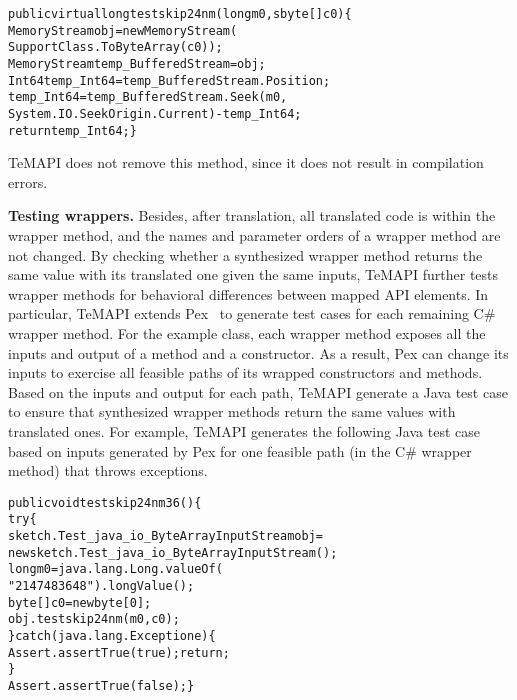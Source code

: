 \begin{CodeOut}
\begin{alltt}
public virtual long testskip24nm(long m0, sbyte[] c0)\{
  MemoryStream obj = new MemoryStream(
                    SupportClass.ToByteArray(c0));
  MemoryStream temp_BufferedStream = obj;
  Int64 temp_Int64 = temp_BufferedStream.Position;
  temp_Int64 = temp_BufferedStream.Seek(m0,
       System.IO.SeekOrigin.Current) - temp_Int64;
  return temp_Int64;\}
\end{alltt}
\end{CodeOut}\vspace*{-2ex}

TeMAPI does not remove this method, since it does not result in compilation errors.


\textbf{Testing wrappers.} Besides, after translation, all translated code is within the wrapper method, and the names and parameter orders of a wrapper method are not changed. By checking whether a synthesized wrapper method returns the same value with its translated one given the same inputs, TeMAPI further tests wrapper methods for behavioral differences between mapped API elements. In particular, TeMAPI extends Pex~\cite{tillmann2008pex} to generate test cases for each remaining C\# wrapper method. For the example class, each wrapper method exposes all the inputs and output of a method and a constructor. As a result, Pex can change its inputs to exercise all feasible paths of its wrapped constructors and methods. Based on the inputs and output for each path, TeMAPI generate a Java test case to ensure that synthesized wrapper methods return the same values with translated ones. For example, TeMAPI generates the following Java test case based on inputs generated by Pex for one feasible path (in the C\# wrapper method) that throws exceptions.

\begin{CodeOut}\vspace*{-1ex}
\begin{alltt}
public void testskip24nm36()\{
  try\{
     sketch.Test_java_io_ByteArrayInputStream obj =
        new sketch.Test_java_io_ByteArrayInputStream();
     long m0 = java.lang.Long.valueOf(
                  "2147483648").longValue();
     byte[] c0 = new byte[0];
     obj.testskip24nm(m0,c0);
  \}catch(java.lang.Exception e)\{
     Assert.assertTrue(true);return;
  \}
  Assert.assertTrue(false);\}
\end{alltt}
\end{CodeOut}\vspace*{-2ex}

